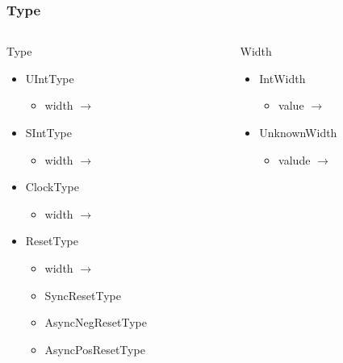\begin{frame}
\end{frame}

\begin{frame}
  \frametitle{Type}

  \begin{columns}[t]
    \begin{column}{0.5\textwidth}
      \begin{block}{Type}
        \begin{itemize}
          \item UIntType
            \begin{itemize}
              \item width \(\rightarrow\) 
            \end{itemize}
          \item SIntType
            \begin{itemize}
              \item width \(\rightarrow\) 
            \end{itemize}
          \item ClockType
            \begin{itemize}
              \item width \(\rightarrow\) 
            \end{itemize}
          \item ResetType
            \begin{itemize}
              \item width \(\rightarrow\) 
            \end{itemize}
            \begin{itemize}
              \item SyncResetType
              \item AsyncNegResetType
              \item AsyncPosResetType
            \end{itemize}
        \end{itemize}
      \end{block}
    \end{column}
    \begin{column}{0.5\textwidth}
      \begin{block}{Width}
        \begin{itemize}
          \item IntWidth
            \begin{itemize}
              \item value \(\rightarrow\) 
            \end{itemize}
          \item UnknownWidth
            \begin{itemize}
              \item valude \(\rightarrow\) 
            \end{itemize}
        \end{itemize}
      \end{block}
    \end{column}

  \end{columns}
\end{frame}


